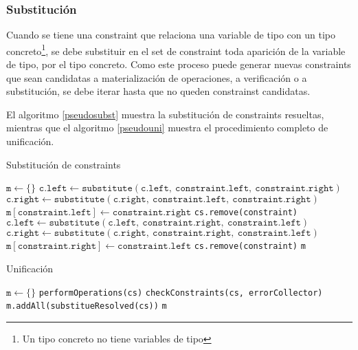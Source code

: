 \subsubsection{Substitución}
Cuando se tiene una constraint que relaciona una variable de tipo con un tipo concreto\footnote{Un tipo concreto no tiene variables de tipo}, se debe substituir en el set de constraint toda aparición de la variable de tipo, por el tipo concreto. Como este proceso puede generar nuevas constraints que sean candidatas a materialización de operaciones, a verificación o a substitución, se debe iterar hasta que no queden constrainst candidatas.

El algoritmo \ref{pseudosubst} muestra la substitución de constraints resueltas, mientras que el algoritmo \ref{pseudouni} muestra el procedimiento completo de unificación.

\begin{algorithm}\captionsetup{labelsep=newline}
  \centering
  \caption{Substitución de constraints}
  \label{pseudosubst}
    \begin{algorithmic}[1]
          \State $\mathtt{m\gets \{\}}$
                \State $\mathtt{c.left\gets substitute(c.left,\ constraint.left,\ constraint.right)}$
                \State $\mathtt{c.right\gets substitute(c.right,\ constraint.left,\ constraint.right)}$
              \EndFor
              \State $\mathtt{m[constraint.left]\gets constraint.right}$
              \State \texttt{cs.remove(constraint)}
            \EndIf
                \State $\mathtt{c.left\gets substitute(c.left,\ constraint.right,\ constraint.left)}$
                \State $\mathtt{c.right\gets substitute(c.right,\ constraint.right,\ constraint.left)}$
              \EndFor
              \State $\mathtt{m[constraint.right]\gets constraint.left}$
              \State \texttt{cs.remove(constraint)}
            \EndIf
          \EndFor
          \State \Return \texttt{m}
      \EndFunction
    \end{algorithmic}
\end{algorithm}

\begin{algorithm}\captionsetup{labelsep=newline}
  \centering
  \caption{Unificación}
  \label{pseudouni}
    \begin{algorithmic}[1]
          \State $\mathtt{m\gets \{\}}$
            \State \texttt{performOperations(cs)}
            \State \texttt{checkConstraints(cs, errorCollector)}
            \State \texttt{m.addAll(substitueResolved(cs))}
          \EndWhile
          \State \Return \texttt{m}
      \EndFunction
    \end{algorithmic}
\end{algorithm}

